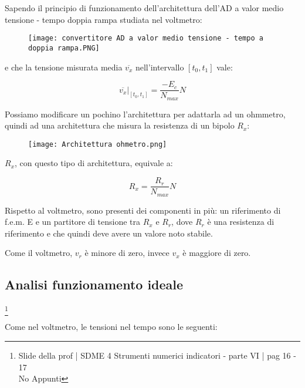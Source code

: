 Sapendo il principio di funzionamento dell'architettura dell'AD a valor medio tensione - tempo doppia rampa studiata nel voltmetro: 

\begin{figure}[h]
    \centering
    \texttt{[image: convertitore AD a valor medio tensione - tempo a doppia rampa.PNG]}
\end{figure}

e che la tensione misurata media $\overline{v_x}$ nell'intervallo $[t_0, t_1]$ vale: 

{
    \Large
    \begin{equation}
        \left.
        \overline{v_x}
        \right|_{[t_0, t_1]}
        = 
        \frac{- E_c }{N_{max}} N
    \end{equation}
}

Possiamo modificare un pochino l'architettura per adattarla ad un ohmmetro, quindi ad una architettura che misura la resistenza di un bipolo $R_x$: 

\begin{figure}[h]
    \centering
    \texttt{[image: Architettura ohmetro.png]}
\end{figure}

$R_x$, con questo tipo di architettura, equivale a: 

{
    \Large
    \begin{equation}
        R_x 
        = 
        \frac{R_r}{N_{max}} N
    \end{equation}
}

Rispetto al voltmetro, sono presenti dei componenti in più: un riferimento di f.e.m. E e un partitore di tensione tra $R_x$ e $R_r$, 
dove $R_r$ è una resistenza di riferimento e che quindi deve avere un valore noto stabile. \newline 

Come il voltmetro, $v_r$ è minore di zero, invece $v_x$ è maggiore di zero. \newline 

\newpage 

\subsection{Analisi funzionamento ideale}
\footnote{Slide della prof | SDME 4 Strumenti numerici indicatori - parte VI | pag 16 - 17 \\  
No Appunti }

Come nel voltmetro, le tensioni nel tempo sono le seguenti: 

